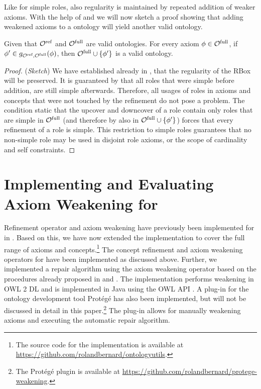 \documentclass[
]{ceurart}
\begin{document}
Like for simple roles, also regularity is maintained by repeated addition of weaker axioms. With the help of  and  we will now sketch a proof showing that adding weakened axioms to a \SROIQ ontology will yield another valid \SROIQ ontology.

\begin{lemma} \label{lem:global-constraints}
  Given that ${\mathcal{O}^\textnormal{ref}}$ and ${\mathcal{O}^\textnormal{full}}$ are valid \SROIQ ontologies. For every axiom $\phi \in {\mathcal{O}^\textnormal{full}}$, if $\phi' \in g_{{\mathcal{O}^\textnormal{ref}},{\mathcal{O}^\textnormal{full}}}(\phi)$, then ${\mathcal{O}^\textnormal{full}} \cup \{ \phi' \}$ is a valid \SROIQ ontology.
\end{lemma}

\begin{proof}(\emph{Sketch})
  We have established already in , that the regularity of the RBox will be preserved.
  It is guaranteed by  that all roles that were simple before addition, are still simple afterwards. Therefore, all usages of roles in axioms and concepts that were not touched by the refinement do not pose a problem. The condition static that the upcover and downcover of a role contain only roles that are simple in ${\mathcal{O}^\textnormal{full}}$ (and therefore by  also in ${\mathcal{O}^\textnormal{full}} \cup \{ \phi' \}$) forces that every refinement of a role is simple. This restriction to simple roles guarantees that no non-simple role may be used in disjoint role axioms, or the scope of cardinality and self constraints.
\end{proof}

\section{Implementing and Evaluating Axiom Weakening for \SROIQ}

Refinement operator and axiom weakening have previously been implemented for \ALC in \cite{troquard2018repairing}. Based on this, we have now extended the implementation to cover the full range of \SROIQ axioms and concepts.\footnote{The source code for the implementation is available at \url{https://github.com/rolandbernard/ontologyutils}.} The concept refinement and axiom weakening operators for \SROIQ have been implemented as discussed above. Further, we implemented a repair algorithm using the axiom weakening operator based on the procedures already proposed in \cite{troquard2018repairing} and \cite{confalonieri2020towards}. The implementation performs weakening in OWL 2 DL \cite{motik2012ontology} and is implemented in Java using the OWL API \cite{horridge2011owl}. A plug-in for the ontology development tool Protégé has also been implemented, but will not be discussed in detail in this paper.\footnote{The Protégé plugin is available at \url{https://github.com/rolandbernard/protege-weakening}.} The plug-in allows for manually weakening axioms and executing the automatic repair algorithm.
\end{document}

